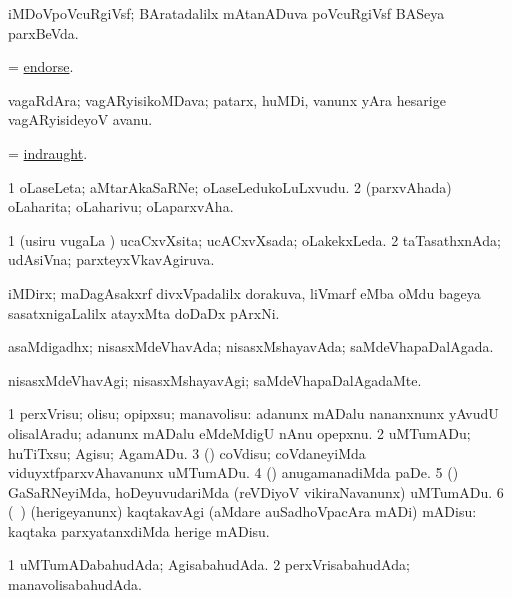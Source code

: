 \bentry
{}
\gl{\nA}
\bmng
iMDoVpoVcuRgiVsf; BAratadalilx mAtanADuva poVcuRgiVsf BASeya parxBeVda. 
\emng
\eentry

\bentry
{}
\gl{\sakirx}
\bmng
= \hyperref{kandict_e.pdf}{E}{endorse}{endorse}. 
\emng
\eentry

\bentry
{}
\gl{\nA}
\bmng
vagaRdAra; vagARyisikoMDava; patarx, huMDi, \mo vanunx yAra hesarige vagARyisideyoV avanu. 
\emng
\eentry

\bentry
{}
\gl{\nA}
\bmng
 = \hyperlink{indraught}{indraught}. 
\emng
\eentry

\bentry
{}
\gl{\nA}
\bmng
\bnum
\num{1} oLaseLeta; aMtarAkaSaRNe; oLaseLedukoLuLxvudu. 
\num{2} (parxvAhada) oLaharita; oLaharivu; oLaparxvAha. 
\enum
\emng
\eentry

\bentry
{}
\gl{\gu}
\bmng
\bnum
\num{1} (usiru \mo vugaLa \vi) ucaCxvXsita; ucACxvXsada; oLakekxLeda. 
\num{2} taTasathxnAda; udAsiVna; parxteyxVkavAgiruva. 
\enum
\emng
\eentry

\bentry
{}
\gl{\nA}
\bmng
iMDirx; maDagAsakxrf divxVpadalilx dorakuva, liVmarf eMba oMdu bageya sasatxnigaLalilx atayxMta doDaDx pArxNi. 
\emng
\eentry

\bentry
{}
\gl{\gu}
\bmng
asaMdigadhx; nisasxMdeVhavAda; nisasxMshayavAda; saMdeVhapaDalAgada. 
\emng
\eentry

\bentry
{}
\gl{\kirxvi}
\bmng
nisasxMdeVhavAgi; nisasxMshayavAgi; saMdeVhapaDalAgadaMte. 
\emng
\eentry

\bentry
{}
\gl{\sakirx}
\bmng
\bnum
\num{1} perxVrisu; olisu; opipxsu; manavolisu:  adanunx mADalu nananxnunx yAvudU olisalAradu; adanunx mADalu eMdeMdigU nAnu opepxnu. 
\num{2} uMTumADu; huTiTxsu; Agisu; AgamADu. 
\num{3} (\viduyx) coVdisu; coVdaneyiMda viduyxtfparxvAhavanunx uMTumADu. 
\num{4} (\takaR) anugamanadiMda paDe. 
\num{5} (\Bwvi) GaSaRNeyiMda, hoDeyuvudariMda (reVDiyoV vikiraNavanunx) uMTumADu. 
\num{6} (\kanmu\ \veYshA) (herigeyanunx) kaqtakavAgi (aMdare auSadhoVpacAra mADi) mADisu:  kaqtaka parxyatanxdiMda herige mADisu. 
\enum
\emng
\eentry

\bentry
{}
\gl{\gu}
\bmng
\bnum
\num{1} uMTumADabahudAda; AgisabahudAda. 
\num{2} perxVrisabahudAda; manavolisabahudAda. 
\enum
\emng
\eentry

